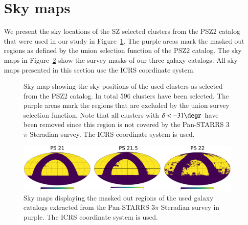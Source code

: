 \documentclass[iop, apjl, twocolappendix, numberedappendix]{emulateapj}
\begin{document}
\section{Sky maps}
\label{sec:figures}
We present the sky locations of the SZ selected clusters from the PSZ2
catalog that were used in our study in Figure~\ref{fig:planck_fig}.
The purple areas mark the masked out regions as defined by the union
selection function of the PSZ2 catalog. The sky maps in
Figure~\ref{fig:heal_map} show the survey masks of our three galaxy
catalogs. All sky maps presented in this section use the ICRS
coordinate system.

\begin{figure}
\caption{Sky map showing the sky positions of the used clusters as
selected from the PSZ2 catalog. In total 596 clusters have been
selected. The purple areas mark the regions that are excluded by the
union survey selection function. Note that all clusters with
$\delta<-31\degr$ have been removed since this region is not covered
by the Pan-STARRS 3$\pi$ Steradian survey. The ICRS coordinate
system is used.}
    \label{fig:planck_fig} 
\end{figure}

\begin{figure}
    \includegraphics[width= \textwidth]{heal_maps.png}
\caption{Sky maps displaying the masked out regions of the used
galaxy catalogs extracted from the Pan-STARRS 3$\pi$ Steradian
survey in purple. The ICRS coordinate system is used.}
   \label{fig:heal_map} 
\end{figure}
\end{document}
